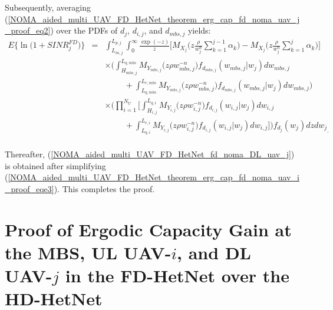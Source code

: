 Subsequently, averaging (\ref{NOMA_aided_multi_UAV_FD_HetNet_theorem_erg_cap_fd_noma_uav_j_proof_eq2}) over the PDFs of $d_j$, $d_{i,j}$, and $d_{mbs,j}$ yields:
\begin{eqnarray} \label{NOMA_aided_multi_UAV_FD_HetNet_theorem_erg_cap_fd_noma_uav_i_proof_eqe3}
E\Big\{\ln\Big(1+SINR_{j}^{FD}\Big) \Big\} & = & \int_{L_{m,j}}^{L_{p,j}} \int_{0}^{\infty} \frac{\exp(-z)}{z} \Bigg[M_{X_j}\Bigg(z \frac{\rho }{w_j^{n}} \sum_{k=1}^{j-1}\alpha_k \Bigg) - M_{X_j}\Bigg(z \frac{\rho }{w_j^{n}} \sum_{k=1}^{j}\alpha_k\Bigg)\Bigg] \nonumber \\
 & & \times \Bigg( \int_{H_{mbs,j}}^{L_{q,mbs}}  M_{Y_{mbs,j}}\Big(z \rho  w_{mbs,j}^{-n} \Big) f_{d_{mbs,j}}(w_{mbs,j}|w_{j}) dw_{mbs,j} \nonumber \\
 & & \hspace{1cm} + \int_{L_{q,mbs}}^{L_{r,mbs}} M_{Y_{mbs,j}}\Big(z \rho  w_{mbs,j}^{-n} \Big) f_{d_{mbs,j}}(w_{mbs,j}|w_{j}) dw_{mbs,j} \Bigg) \nonumber \\
 & & \times \Bigg( \prod_{i=1}^{N_U} \Bigg[\int_{H_{i,j}}^{L_{q,i}} M_{Y_{i,j}}\Big(z \rho  w_{i,j}^{-n}\Big) f_{d_{i,j}}(w_{i,j}|w_{j}) dw_{i,j} \nonumber \\
 & & \hspace{1cm} + \int_{L_{q,i}}^{L_{r,i}} M_{Y_{i,j}}\Big(z \rho  w_{i,j}^{-n}\Big) f_{d_{i,j}}(w_{i,j}|w_{j}) dw_{i,j} \Bigg] \Bigg) f_{d_{j}}(w_j) dz {dw_j}_. \nonumber \\
\end{eqnarray}

Thereafter, (\ref{NOMA_aided_multi_UAV_FD_HetNet_fd_noma_DL_uav_j}) is obtained after simplifying (\ref{NOMA_aided_multi_UAV_FD_HetNet_theorem_erg_cap_fd_noma_uav_i_proof_eqe3}). This completes the proof.

\section{Proof of Ergodic Capacity Gain at the MBS, UL UAV-$i$, and DL UAV-$j$ in the FD-HetNet over the HD-HetNet} \label{NOMA_aided_multi_UAV_FD_HetNet_corollary_erg_cap_gain_proof}

